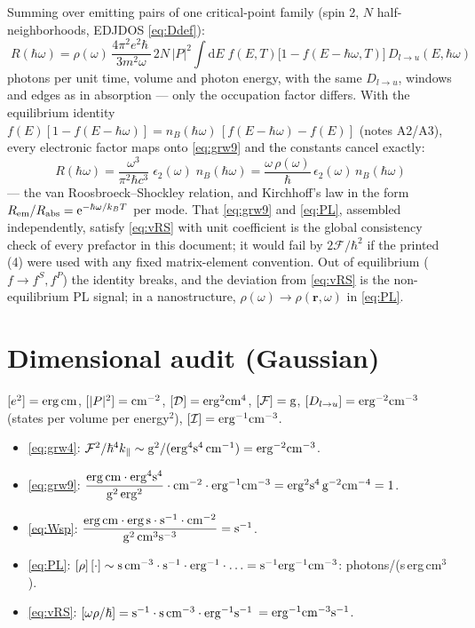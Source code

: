 \documentclass[11pt,a4paper]{article}
\numberwithin{equation}{section}
\newcommand{\hw}{\hbar\omega}
\newcommand{\cD}{\mathcal{D}}
\newcommand{\cF}{\mathcal{F}}
\newcommand{\cI}{\mathcal{I}}
\newcommand{\kpar}{k_{\parallel}}
\newcommand{\dd}{\mathrm{d}}
\newcommand{\rme}{\mathrm{e}}
\begin{document}
Summing over emitting pairs of one critical-point family (spin 2,
$N$ half-neighborhoods, EDJDOS \eqref{eq:Ddef}):
\begin{equation}
\boxed{\;
R(\hw)=\rho(\omega)\,
\frac{4\pi^2e^2\hbar\,}{3m^2\omega}\,
2N\,|P|^2
\int\!\dd E\;
f(E,T)\bigl[1-f(E-\hw,T)\bigr]\,D_{l\to u}(E,\hw)
\;}
\label{eq:PL}
\end{equation}
photons per unit time, volume and photon energy, with the same
$D_{l\to u}$, windows and edges as in absorption --- only the
occupation factor differs.  With the equilibrium identity
$f(E)[1-f(E-\hw)]=n_B(\hw)\,[f(E-\hw)-f(E)]$ (notes A2/A3), every
electronic factor maps onto \eqref{eq:grw9} and the constants cancel
exactly:
\begin{equation}
\boxed{\;
R(\hw)=\frac{\omega^3}{\pi^2\hbar c^3}\;
\epsilon_2(\omega)\;n_B(\hw)
=\frac{\omega\,\rho(\omega)}{\hbar}\,\epsilon_2(\omega)\,n_B(\hw)
\;}
\label{eq:vRS}
\end{equation}
--- the van Roosbroeck--Shockley relation, and Kirchhoff's law in the
form $R_{\rm em}/R_{\rm abs}=\rme^{-\hw/k_BT}$ per mode.  That
\eqref{eq:grw9} and \eqref{eq:PL}, assembled independently, satisfy
\eqref{eq:vRS} with unit coefficient is the global consistency check
of every prefactor in this document; it would fail by $2\cF/\hbar^2$
if the printed (4) were used with any fixed matrix-element
convention.  Out of equilibrium ($f\to f^S,f^P$) the identity breaks,
and the deviation from \eqref{eq:vRS} is the non-equilibrium PL
signal; in a nanostructure, $\rho(\omega)\to\rho(\mathbf r,\omega)$
in \eqref{eq:PL}.

\appendix
\section{Dimensional audit (Gaussian)}

$[e^2]={\rm erg\,cm}$, $[|P|^2]={\rm cm^{-2}}$,
$[\cD]={\rm erg^2cm^4}$, $[\cF]={\rm g}$,
$[D_{l\to u}]={\rm erg^{-2}cm^{-3}}$ (states per volume per
energy$^2$), $[\cI]={\rm erg^{-1}cm^{-3}}$.
\begin{itemize}
\item \eqref{eq:grw4}:
$\cF^2/\hbar^4\kpar\sim{\rm g^2}/({\rm erg^4s^4\,cm^{-1}})
={\rm erg^{-2}cm^{-3}}$.\ \checkmark
\item \eqref{eq:grw9}:
$\dfrac{{\rm erg\,cm}\cdot{\rm erg^4s^4}}{{\rm g^2\,erg^2}}
\cdot{\rm cm^{-2}}\cdot{\rm erg^{-1}cm^{-3}}
={\rm erg^2s^4\,g^{-2}cm^{-4}}=1$.\ \checkmark
\item \eqref{eq:Wsp}:
$\dfrac{{\rm erg\,cm}\cdot{\rm erg\,s}\cdot{\rm s^{-1}}\cdot{\rm cm^{-2}}}
{{\rm g^2\,cm^3s^{-3}}}={\rm s^{-1}}$.\ \checkmark
\item \eqref{eq:PL}: $[\rho]\,[\cdot]\sim{\rm s\,cm^{-3}}\cdot
{\rm s^{-1}}\cdot{\rm erg^{-1}}\cdot\ldots
={\rm s^{-1}erg^{-1}cm^{-3}}$: photons/(s\,erg\,cm$^3$).\ \checkmark
\item \eqref{eq:vRS}: $[\omega\rho/\hbar]
={\rm s^{-1}}\cdot{\rm s\,cm^{-3}}\cdot{\rm erg^{-1}s^{-1}}$
$={\rm erg^{-1}cm^{-3}s^{-1}}$.\ \checkmark
\end{itemize}
\end{document}
